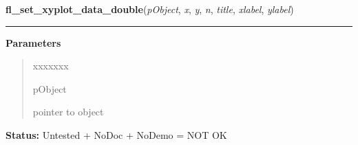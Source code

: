 \hspace{.8\funcindent}\begin{boxedminipage}{\funcwidth}

    \raggedright \textbf{fl\_set\_xyplot\_data\_double}(\textit{pObject}, \textit{x}, \textit{y}, \textit{n}, \textit{title}, \textit{xlabel}, \textit{ylabel})

    \vspace{-1.5ex}

    \rule{\textwidth}{0.5\fboxrule}
\setlength{\parskip}{2ex}
\setlength{\parskip}{1ex}
      \textbf{Parameters}
      \vspace{-1ex}

      \begin{quote}
        \begin{Ventry}{xxxxxxx}

          \item[pObject]

          pointer to object

        \end{Ventry}

      \end{quote}

\textbf{Status:} Untested + NoDoc + NoDemo = NOT OK



    \end{boxedminipage}

    \label{xformslib:library:fl_set_xyplot_file}

    \vspace{0.5ex}

